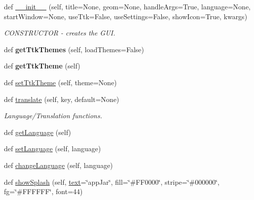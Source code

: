 \begin{DoxyCompactItemize}
\item 
def \hyperlink{class_python_01_g_u_i_1_1appjar_1_1gui_a72e750fb68d42cb68b0fe7779328b062}{\+\_\+\+\_\+init\+\_\+\+\_\+} (self, title=None, geom=None, handle\+Args=True, language=None, start\+Window=None, use\+Ttk=False, use\+Settings=False, show\+Icon=True, kwargs)
\begin{DoxyCompactList}\small\item\em C\+O\+N\+S\+T\+R\+U\+C\+T\+OR -\/ creates the G\+UI. \end{DoxyCompactList}\item 
\mbox{\label{class_python_01_g_u_i_1_1appjar_1_1gui_ad9703dac39072c2769ab9e9cfb934c33}} 
def {\bfseries get\+Ttk\+Themes} (self, load\+Themes=False)
\item 
\mbox{\label{class_python_01_g_u_i_1_1appjar_1_1gui_ad6bf40f04efeb124ddea19f96af1f35c}} 
def {\bfseries get\+Ttk\+Theme} (self)
\item 
def \hyperlink{class_python_01_g_u_i_1_1appjar_1_1gui_a8a81af58d70660baa19979087d024f73}{set\+Ttk\+Theme} (self, theme=None)
\item 
def \hyperlink{class_python_01_g_u_i_1_1appjar_1_1gui_ad4fafaf0c6edbbcdee2a677608cd6fca}{translate} (self, key, default=None)
\begin{DoxyCompactList}\small\item\em Language/\+Translation functions. \end{DoxyCompactList}\item 
def \hyperlink{class_python_01_g_u_i_1_1appjar_1_1gui_a1c51195c19cb5d9bbd998f08ad9f7dec}{get\+Language} (self)
\item 
def \hyperlink{class_python_01_g_u_i_1_1appjar_1_1gui_ab0a8df2b72875b971b6a19e91e7c9c3d}{set\+Language} (self, language)
\item 
def \hyperlink{class_python_01_g_u_i_1_1appjar_1_1gui_ac1088d844cb4dc3cca7716ac5568d593}{change\+Language} (self, language)
\item 
def \hyperlink{class_python_01_g_u_i_1_1appjar_1_1gui_ac15d37bf52372417f1f95c0ba245cf10}{show\+Splash} (self, \hyperlink{class_python_01_g_u_i_1_1appjar_1_1gui_a6a060ddfec169e464326a0dd179a559e}{text}=\char`\"{}app\+Jar\char`\"{}, fill=\char`\"{}\#F\+F0000\char`\"{}, stripe=\char`\"{}\#000000\char`\"{}, fg=\char`\"{}\#F\+F\+F\+F\+FF\char`\"{}, font=44)

\end{DoxyCompactItemize}
